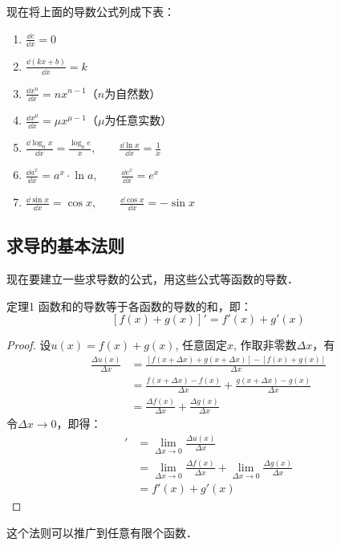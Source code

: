 现在将上面的导数公式列成下表：
\begin{enumerate}
    \item $\frac{\dd c}{\dd x}=0$
    \item $\frac{\dd(kx+b)}{\dd x}=k$
    \item $\frac{\dd x^n}{\dd x}=nx^{n-1}$\quad （$n$为自然数）
    \item $\frac{\dd x^\mu}{\dd x}=\mu x^{\mu-1}$\quad （$\mu$为任意实数）
    \item $\frac{\dd\log_a x}{\dd x}=\frac{\log_a e}{x},\qquad \frac{\dd \ln x}{\dd x}=\frac{1}{x}$
    \item $\frac{\dd a^x}{\dd x}=a^x\cdot \ln a,\qquad \frac{\dd e^x}{\dd x}=e^x$
    \item $\frac{\dd\sin x}{\dd x}=\cos x,\qquad \frac{\dd \cos x}{\dd x}=-\sin x$
\end{enumerate}

\subsection{求导的基本法则}

现在要建立一些求导数的公式，用这些公式等函数的导数．

\begin{blk}
{定理1} 函数和的导数等于各函数的导数的和，即：
\[[f (x) +g (x) ] '=f' (x) +g' (x)\] 
\end{blk}

\begin{proof}
    设$u(x)=f(x)+g(x)$, 任意固定$x$, 作取非零数$\Delta x$，有 
\begin{align*}
    \frac{\Delta u(x)}{\Delta x}&=\frac{[f(x+\Delta x)+g(x+\Delta x)]-[f(x)+g(x)]}{\Delta x}\\
    &=\frac{f(x+\Delta x)-f(x)}{\Delta x}+\frac{g(x+\Delta x)-g(x)}{\Delta x}\\
    &=\frac{\Delta f(x)}{\Delta x}+\frac{\Delta g(x)}{\Delta x}
\end{align*}
令$\Delta x\to 0$，即得：
\begin{align*}
    [f(x)+g(x)]'&=\lim_{\Delta x\to 0}\frac{\Delta u(x)}{\Delta x}\\
    &=\lim_{\Delta x\to 0}\frac{\Delta f(x)}{\Delta x}+\lim_{\Delta x\to 0}\frac{\Delta g(x)}{\Delta x}\\
    &=f'(x)+g'(x)
\end{align*}
\end{proof}

这个法则可以推广到任意有限个函数．

